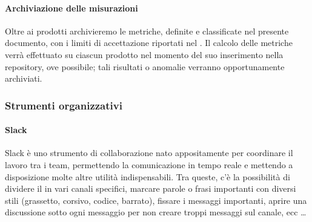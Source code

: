     		\paragraph{Archiviazione delle misurazioni}
			Oltre ai prodotti archivieremo le metriche, definite e classificate nel presente documento, con i limiti di accettazione riportati nel \Doc{\PdQv}.
			Il calcolo delle metriche verrà effettuato su ciascun prodotto nel momento del suo inserimento nella repository, ove possibile; tali risultati
			o anomalie verranno opportunamente archiviati. %


    	\subsubsection{Strumenti organizzativi}\label{PianificazioneCoordinamento}

    		\paragraph{Slack}
			Slack è uno strumento di collaborazione nato appositamente per coordinare il lavoro tra i team, permettendo la comunicazione in tempo
			reale e mettendo a disposizione molte altre utilità indispensabili. Tra queste, c'è la possibilità di dividere il 
			in vari canali specifici, marcare parole o frasi importanti con diversi stili (grassetto, corsivo, codice, barrato), fissare i messaggi
			importanti, aprire una discussione sotto ogni messaggio per non creare troppi messaggi sul canale, ecc \dots


